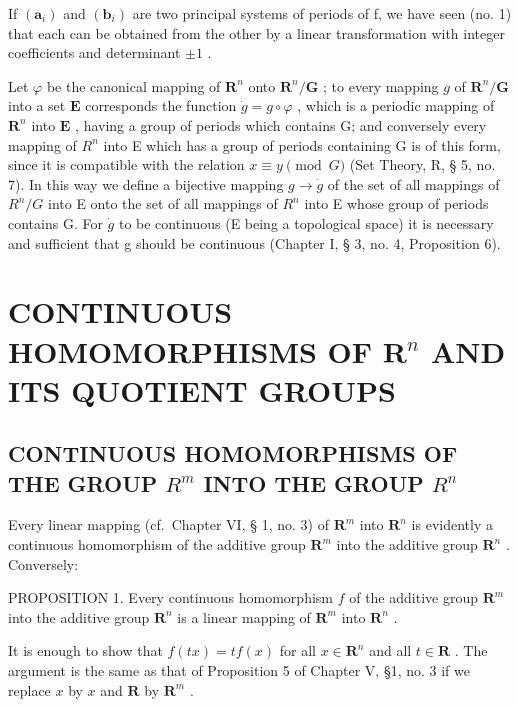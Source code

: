 If \((\boldsymbol{a}_{i})\) and \((\boldsymbol{b}_{i})\) are two principal systems of periods of f, we have seen (no. 1) that each can be obtained from the other by a linear transformation with integer coefficients and determinant \(\pm1\) .

Let \(\varphi\) be the canonical mapping of \(\mathbf{R}^n\) onto \(\mathbf{R}^n/\mathbf{G}\) ; to every mapping \(g\) of \(\mathbf{R}^n/\mathbf{G}\) into a set \(\mathbf{E}\) corresponds the function \(\dot{g}=g\circ\varphi\) , which is a periodic mapping of \(\mathbf{R}^n\) into \(\mathbf{E}\) , having a group of periods which contains G; and conversely every mapping of \(R^{n}\) into E which has a group of periods containing G is of this form, since it is compatible with the relation \(x \equiv y \pmod{G}\) (Set Theory, R, § 5, no. 7). In this way we define a bijective mapping \(g \to \dot{g}\) of the set of all mappings of \(R^{n}/G\) into E onto the set of all mappings of \(R^{n}\) into E whose group of periods contains G. For \(\dot{g}\) to be continuous (E being a topological space) it is necessary and sufficient that g should be continuous (Chapter I, § 3, no. 4, Proposition 6).

\section{\texorpdfstring{CONTINUOUS HOMOMORPHISMS OF \(\mathbf{R}^n\) AND ITS QUOTIENT GROUPS}{CONTINUOUS HOMOMORPHISMS OF R TO THE N AND ITS QUOTIENT GROUPS}}

\subsection{\texorpdfstring{CONTINUOUS HOMOMORPHISMS OF THE GROUP \(R^{m}\) INTO THE GROUP \(R^{n}\)}{CONTINUOUS HOMOMORPHISMS OF THE GROUP R TO THE M INTO THE GROUP R TO THE N}}

Every linear mapping (cf.~Chapter VI, § 1, no. 3) of \(\mathbf{R}^{m}\) into \(\mathbf{R}^{n}\) is evidently a continuous homomorphism of the additive group \(\mathbf{R}^{m}\) into the additive group \(\mathbf{R}^{n}\) . Conversely:

PROPOSITION 1. Every continuous homomorphism \(f\) of the additive group \(\mathbf{R}^m\) into the additive group \(\mathbf{R}^n\) is a linear mapping of \(\mathbf{R}^m\) into \(\mathbf{R}^n\) .

It is enough to show that \(f(tx) = tf(x)\) for all \(x \in \mathbf{R}^n\) and all \(t \in \mathbf{R}\) . The argument is the same as that of Proposition 5 of Chapter V, §1, no. 3 if we replace \(x\) by \(x\) and \(\mathbf{R}\) by \(\mathbf{R}^m\) .

